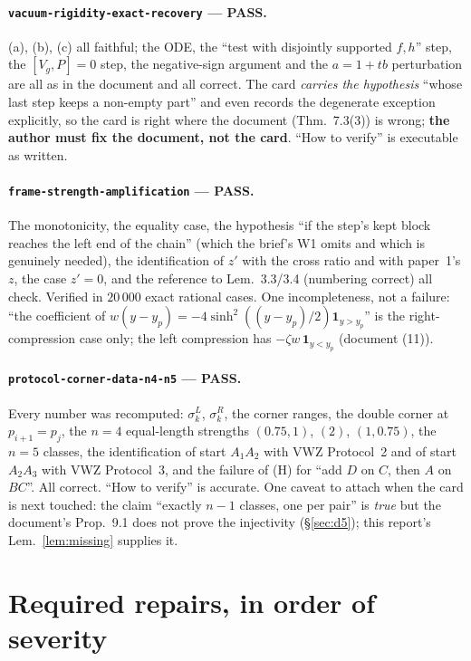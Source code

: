 \documentclass[11pt]{article}
\theoremstyle{definition}\newtheorem{example}[theorem]{Example}
\begin{document}
\paragraph{\texttt{vacuum-rigidity-exact-recovery} --- PASS.}
(a), (b), (c) all faithful; the ODE, the ``test with disjointly supported $f,h$'' step, the
$[V_g,P]=0$ step, the negative-sign argument and the $a=1+tb$ perturbation are all as in
the document and all correct.  The card \emph{carries the hypothesis} ``whose last step
keeps a non-empty part'' and even records the degenerate exception explicitly, so the card
is right where the document (Thm.~7.3(3)) is wrong; \textbf{the author must fix the
document, not the card}.  ``How to verify'' is executable as written.

\paragraph{\texttt{frame-strength-amplification} --- PASS.}
The monotonicity, the equality case, the hypothesis ``if the step's kept block reaches the
left end of the chain'' (which the brief's W1 omits and which is genuinely needed), the
identification of $z'$ with the cross ratio and with paper~1's $z$, the case $z'=0$, and
the reference to Lem.~3.3/3.4 (numbering correct) all check.  Verified in $20\,000$ exact
rational cases.  One incompleteness, not a failure: ``the coefficient of
$w(y-y_p)=-4\sinh^2((y-y_p)/2)\mathbf 1_{y>y_p}$'' is the right-compression case only; the
left compression has $-\zeta w\,\mathbf 1_{y<y_p}$ (document (11)).

\paragraph{\texttt{protocol-corner-data-n4-n5} --- PASS.}
Every number was recomputed: $\sigma^L_k$, $\sigma^R_k$, the corner ranges, the double
corner at $p_{i+1}=p_j$, the $n=4$ equal-length strengths $(0.75,1)$, $(2)$, $(1,0.75)$,
the $n=5$ classes, the identification of start $A_1A_2$ with VWZ Protocol~2 and of start
$A_2A_3$ with VWZ Protocol~3, and the failure of (H) for ``add $D$ on $C$, then $A$ on
$BC$''.  All correct.  ``How to verify'' is accurate.  One caveat to attach when the card
is next touched: the claim ``exactly $n-1$ classes, one per pair'' is \emph{true} but the
document's Prop.~9.1 does not prove the injectivity (\S\ref{sec:d5}); this report's
Lem.~\ref{lem:missing} supplies it.


\section{Required repairs, in order of severity}\label{sec:repairs}
\end{document}
